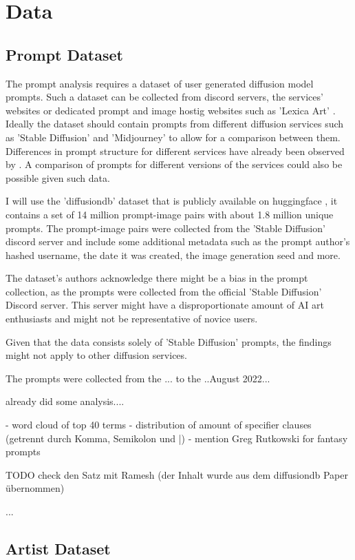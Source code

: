 \chapter{Data}
\label{cha:Data}

\section{Prompt Dataset}

The prompt analysis requires a dataset of user generated diffusion model prompts. Such a dataset can be collected from discord servers, the services' websites or dedicated prompt and image hostig websites such as 'Lexica Art' \autocite{lexica}. Ideally the dataset should contain prompts from different diffusion services such as 'Stable Diffusion' and 'Midjourney' to allow for a comparison between them. Differences in prompt structure for different services have already been observed by \autocite{ramesh}.
A comparison of prompts for different versions of the services could also be possible given such data.

I will use the 'diffusiondb' dataset that is publicly available on huggingface \autocite{poloclub-diffusiondb}, it contains a set of 14 million prompt-image pairs with about 1.8 million unique prompts. The prompt-image pairs were collected from the 'Stable Diffusion' discord server and include some additional metadata such as the prompt author's hashed username, the date it was created, the image generation seed and more.

The dataset's authors \autocite{poloclub-diffusiondb} acknowledge there might be a bias in the prompt collection, as the prompts were collected from the official 'Stable Diffusion' Discord server. This server might have a disproportionate amount of AI art enthusiasts and might not be representative of novice users.


Given that the data consists solely of 'Stable Diffusion' prompts, the findings might not apply to other diffusion services.

The prompts were collected from the ... to the ..August 2022...

\autocite{poloclub-diffusiondb} already did some analysis....

- word cloud of top 40 terms
- distribution of amount of specifier clauses (getrennt durch Komma, Semikolon und |)
- mention Greg Rutkowski for fantasy prompts


TODO check den Satz mit Ramesh (der Inhalt wurde aus dem diffusiondb Paper übernommen)

...

\section{Artist Dataset}

